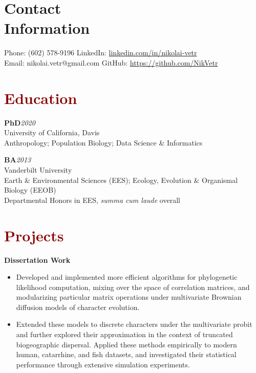 \documentclass[11pt,margin,line]{resume}
\begin{document}
\name{\huge \textcolor{DarkRed}{Nikolai Vetr}}
\begin{resume}
    \vspace{-2mm}
     \section{\mysidestyle Contact\\Information}
    
    Phone: (602) 578-9196       \hfill LinkedIn: \url{linkedin.com/in/nikolai-vetr} \\
    \noindent Email: nikolai.vetr@gmail.com  \hfill GitHub: \url{https://github.com/NikVetr} \vspace{0mm}\\\vspace{-4.5mm}



    \section{\large\textcolor{DarkRed}{Education}}

   
\textbf{PhD}\hfill\emph{2020}\\
University of California, Davis\\
Anthropology; Population Biology; Data Science \& Informatics

\textbf{BA}\hfill\emph{2013}\\
Vanderbilt University\\
Earth \& Environmental Sciences (EES); Ecology, Evolution \& Organismal Biology (EEOB)\\
Departmental Honors in EES, \textit{summa cum laude} overall\\
\vspace{-1.25em}



    \section{\large\textcolor{DarkRed}{Projects}}

    \textbf{Dissertation Work}
    \begin{itemize}[noitemsep]
    \item Developed and implemented more efficient algorithms for phylogenetic likelihood computation, mixing over the space of correlation matrices, and modularizing particular matrix operations under multivariate Brownian diffusion models of character evolution.
    \item Extended these models to discrete characters under the multivariate probit and further explored their approximation in the context of truncated biogeographic dispersal. Applied these methods empirically to modern human, catarrhine, and fish datasets, and investigated their statistical performance through extensive simulation experiments. 
\end{itemize}


\end{resume}
\end{document}
